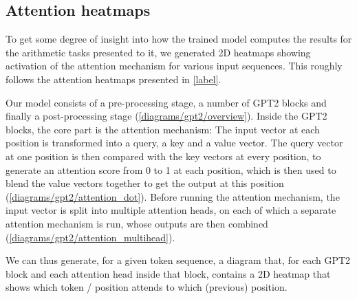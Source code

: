 \subsection{Attention heatmaps}
\label{arith:heatmap}

To get some degree of insight into how the trained model computes the results for the arithmetic tasks presented to it, we generated 2D heatmaps showing activation of the attention mechanism for various input sequences. This roughly follows the attention heatmaps presented in \cref{label}.

Our model consists of a pre-processing stage, a number of GPT2 blocks and finally a post-processing stage (\cref{diagrams/gpt2/overview}). Inside the GPT2 blocks, the core part is the attention mechanism: The input vector at each position is transformed into a query, a key and a value vector. The query vector at one position is then compared with the key vectors at every position, to generate an attention score from 0 to 1 at each position, which is then used to blend the value vectors together to get the output at this position (\cref{diagrams/gpt2/attention_dot}).
Before running the attention mechanism, the input vector is split into multiple attention heads, on each of which a separate attention mechanism is run, whose outputs are then combined (\cref{diagrams/gpt2/attention_multihead}).

We can thus generate, for a given token sequence,
a diagram that, for each GPT2 block and each attention head inside that block, contains a 2D heatmap that shows which token / position attends to which (previous) position.

